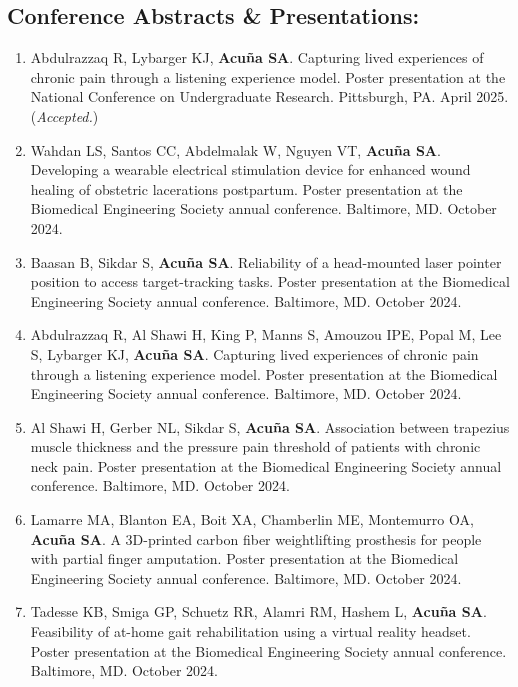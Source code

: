 \documentclass[letterpaper, 10pt]{article}
\begin{document}
\subsection{Conference Abstracts \& Presentations:} %
\begin{enumerate}
    \item Abdulrazzaq R, Lybarger KJ, \textbf{Acuña SA}. Capturing lived experiences of chronic pain through a listening experience model. Poster presentation at the National Conference on Undergraduate Research. Pittsburgh, PA. April 2025. (\textit{Accepted.})
    \item Wahdan LS, Santos CC, Abdelmalak W, Nguyen VT, \textbf{Acuña SA}. Developing a wearable electrical stimulation device for enhanced wound healing of obstetric lacerations postpartum. Poster presentation at the Biomedical Engineering Society annual conference. Baltimore, MD. October 2024.
    \item Baasan B, Sikdar S, \textbf{Acuña SA}. Reliability of a head-mounted laser pointer position to access target-tracking tasks. Poster presentation at the Biomedical Engineering Society annual conference. Baltimore, MD. October 2024.
    \item Abdulrazzaq R, Al Shawi H, King P, Manns S, Amouzou IPE, Popal M, Lee S, Lybarger KJ, \textbf{Acuña SA}. Capturing lived experiences of chronic pain through a listening experience model. Poster presentation at the Biomedical Engineering Society annual conference. Baltimore, MD. October 2024.
    \item Al Shawi H, Gerber NL, Sikdar S, \textbf{Acuña SA}. Association between trapezius muscle thickness and the pressure pain threshold of patients with chronic neck pain. Poster presentation at the Biomedical Engineering Society annual conference. Baltimore, MD. October 2024.
    \item Lamarre MA, Blanton EA, Boit XA, Chamberlin ME, Montemurro OA, \textbf{Acuña SA}. A 3D-printed carbon fiber weightlifting prosthesis for people with partial finger amputation. Poster presentation at the Biomedical Engineering Society annual conference. Baltimore, MD. October 2024.
    \item Tadesse KB, Smiga GP, Schuetz RR, Alamri RM, Hashem L, \textbf{Acuña SA}. Feasibility of at-home gait rehabilitation using a virtual reality headset. Poster presentation at the Biomedical Engineering Society annual conference. Baltimore, MD. October 2024.

\end{enumerate}
\end{document}
